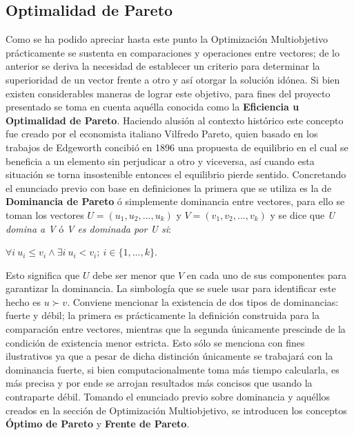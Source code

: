 \documentclass[class=report, crop=false]{standalone}
\begin{document}
\subsection{Optimalidad de Pareto}      
Como se ha podido apreciar hasta este punto la Optimización 
Multiobjetivo prácticamente se sustenta en comparaciones y 
operaciones entre vectores; de lo anterior se deriva la 
necesidad de establecer un criterio para determinar la superioridad 
de un vector frente a otro y así otorgar la solución idónea.\break
Si bien existen considerables maneras de lograr este objetivo, 
para fines del proyecto presentado se toma en cuenta aquélla 
conocida como la \textbf{Eficiencia u Optimalidad de Pareto}.\medskip\break
Haciendo alusión al contexto histórico este concepto fue 
creado por el economista italiano Vilfredo Pareto, quien basado 
en los trabajos de Edgeworth \cite{b4} concibió en 1896 una 
propuesta de equilibrio en el cual se beneficia a un elemento 
sin perjudicar a otro y viceversa, así cuando esta situación 
se torna insostenible entonces el equilibrio pierde sentido.\break
Concretando el enunciado previo con base en definiciones la 
primera que se utiliza es la de \textbf{Dominancia de Pareto} ó 
simplemente dominancia entre vectores, para ello se toman los 
vectores $U = (u_1 , u_2 , ..., u_k)$ y $V = (v_1 , v_2 , ..., v_k)$ 
y se dice que \textit{U domina a V} ó \textit{V es dominada por U si}:\medskip\break
\centerline{$\forall i\ u_i \leq v_i \land \exists i\ u_i < v_i;\ i \in \{1, ..., k\}$.}\medskip\break
Esto significa que $U$ debe ser menor que $V$ en cada uno de sus 
componentes para garantizar la dominancia.
La simbología que se suele usar para identificar este hecho es $u \succ v$.\medskip\break
Conviene mencionar la existencia de dos tipos de dominancias: 
fuerte y débil; la primera es prácticamente la definición 
construida para la comparación entre vectores, mientras que 
la segunda únicamente prescinde de la condición de existencia 
menor estricta.\break
Esto sólo se menciona con fines ilustrativos ya que a pesar de 
dicha distinción únicamente se trabajará con la dominancia fuerte, 
si bien computacionalmente toma más tiempo calcularla, es más 
precisa y por ende se arrojan resultados más concisos que usando 
la contraparte débil.\medskip\break
Tomando el enunciado previo sobre dominancia y aquéllos creados en 
la sección de Optimización Multiobjetivo, se introducen los conceptos 
\textbf{Óptimo de Pareto} y \textbf{Frente de Pareto}.\break
\end{document}
